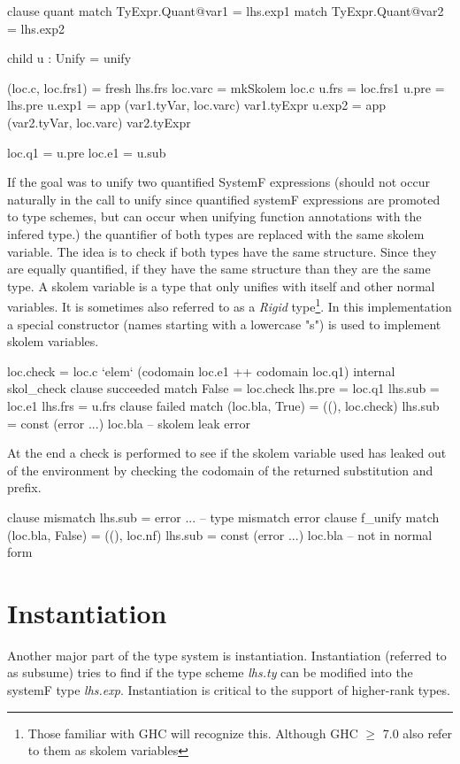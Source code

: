\begin{code}
clause quant
  match TyExpr.Quant@var1 = lhs.exp1
  match TyExpr.Quant@var2 = lhs.exp2
  
  child u : Unify = unify
  
  (loc.c, loc.frs1) = fresh lhs.frs
  loc.varc = mkSkolem loc.c
  u.frs   = loc.frs1
  u.pre   = lhs.pre
  u.exp1  = app (var1.tyVar, loc.varc) var1.tyExpr
  u.exp2  = app (var2.tyVar, loc.varc) var2.tyExpr
          
  loc.q1  = u.pre
  loc.e1  = u.sub
\end{code}
If the goal was to unify two quantified SystemF expressions (should not occur naturally in the call to unify since quantified systemF expressions are promoted to type schemes, but can occur when unifying function annotations with the infered type.) the quantifier of both types are replaced with the same skolem variable. The idea is to check if both types have the same structure. Since they are equally quantified, if they have the same structure than they are the same type.
A skolem variable is a type that only unifies with itself and other normal variables. It is sometimes also referred to as a \emph{Rigid} type\footnote{Those familiar with GHC will recognize this. Although GHC $\geq$ 7.0 also refer to them as skolem variables}. In this implementation a special constructor (names starting with a lowercase "s") is used to implement skolem variables.
\begin{code}                       
loc.check = loc.c `elem` (codomain loc.e1 ++ codomain loc.q1)
internal skol_check
   clause succeeded
     match False  = loc.check
     lhs.pre  = loc.q1
     lhs.sub  = loc.e1
     lhs.frs  = u.frs
   clause failed
     match (loc.bla, True) = ((), loc.check)
     lhs.sub = const (error ...) loc.bla -- skolem leak error
\end{code}
At the end a check is performed to see if the skolem variable used has leaked out of the environment by checking the codomain of the returned substitution and prefix.

\begin{code}
    clause mismatch
      lhs.sub = error ... -- type mismatch error
clause f_unify
  match (loc.bla, False) = ((), loc.nf)
  lhs.sub = const (error ...) loc.bla -- not in normal form
\end{code}

\section{Instantiation}
Another major part of the type system is instantiation. Instantiation (referred to as subsume) tries to find if the type scheme \emph{lhs.ty} can be modified into the systemF type \emph{lhs.exp}. Instantiation is critical to the support of higher-rank types.

